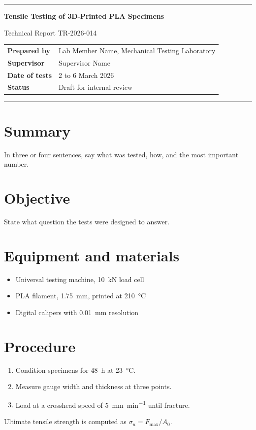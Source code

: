 \documentclass[11pt,a4paper]{article}
\newcommand{\reportnumber}{TR-2026-014}
\newcommand{\reporttitle}{Tensile Testing of 3D-Printed PLA Specimens}
\begin{document}
\thispagestyle{empty}
{\color{band}\rule{\linewidth}{4pt}}
\vspace{0.5em}

{\noindent\Huge\bfseries\reporttitle\par}
\vspace{0.4em}
{\noindent\large Technical Report \reportnumber\par}
\vspace{1.2em}

\noindent\begin{tabularx}{\linewidth}{@{}lX@{}}
\textbf{Prepared by} & Lab Member Name, Mechanical Testing Laboratory \\
\textbf{Supervisor} & Supervisor Name \\
\textbf{Date of tests} & 2 to 6 March 2026 \\
\textbf{Status} & Draft for internal review \\
\end{tabularx}

\vspace{1em}
{\color{band}\rule{\linewidth}{0.6pt}}

\section*{Summary}
In three or four sentences, say what was tested, how, and the most important number.

\tableofcontents

\section{Objective}
State what question the tests were designed to answer.

\section{Equipment and materials}
\begin{itemize}
  \item Universal testing machine, \SI{10}{\kilo\newton} load cell
  \item PLA filament, \SI{1.75}{\milli\metre}, printed at \SI{210}{\celsius}
  \item Digital calipers with \SI{0.01}{\milli\metre} resolution
\end{itemize}

\section{Procedure}
\begin{enumerate}
  \item Condition specimens for \SI{48}{\hour} at \SI{23}{\celsius}.
  \item Measure gauge width and thickness at three points.
  \item Load at a crosshead speed of \SI{5}{\milli\metre\per\minute} until fracture.
\end{enumerate}
Ultimate tensile strength is computed as $\sigma_u = F_{\max}/A_0$.
\end{document}
